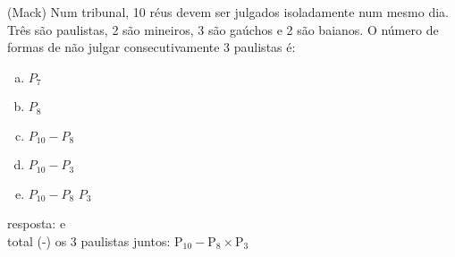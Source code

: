 \begin{ex}
 (Mack) Num tribunal, 10 réus devem ser julgados isoladamente num mesmo dia. Três são paulistas, 2 são mineiros, 3 são gaúchos e 2 são baianos. O número de formas de não julgar consecutivamente 3 paulistas é:
    \begin{enumerate}[(a)]
    \item $P_7$
    \item $P_8$
    \item $P_{10} - P_8$
    \item $P_{10} - P_3$
    \item $P_{10} - P_8$    $P_3 $
    \end{enumerate}
      \begin{sol}
        resposta: e \\
        total (-) os 3 paulistas juntos:\hspace{0,5cm}
        $\mathrm{P}_{10}-\mathrm{P}_{8}\times\mathrm{P}_3$
      \end{sol}
\end{ex}